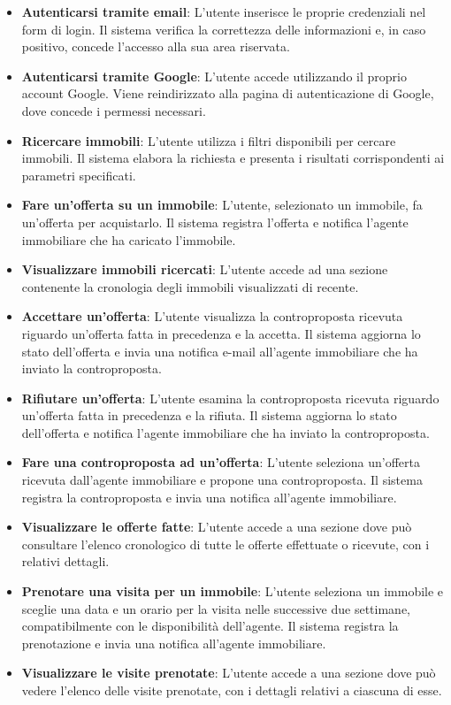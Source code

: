 \documentclass{book}
\begin{document}
\begin{itemize}
    \item \textbf{Autenticarsi tramite email}: L'utente inserisce le proprie credenziali nel form di login. Il sistema verifica la correttezza delle informazioni e, in caso positivo, concede l'accesso alla sua area riservata.
    \item \textbf{Autenticarsi tramite Google}: L'utente accede utilizzando il proprio account Google. Viene reindirizzato alla pagina di autenticazione di Google, dove concede i permessi necessari.
    \item \textbf{Ricercare immobili}: L'utente utilizza i filtri disponibili per cercare immobili. Il sistema elabora la richiesta e presenta i risultati corrispondenti ai parametri specificati.
    \item \textbf{Fare un'offerta su un immobile}: L'utente, selezionato un immobile, fa un'offerta per acquistarlo. Il sistema registra l'offerta e notifica l'agente immobiliare che ha caricato l'immobile.
    \item \textbf{Visualizzare immobili ricercati}: L'utente accede ad una sezione contenente la cronologia degli immobili visualizzati di recente.
    \item \textbf{Accettare un'offerta}: L'utente visualizza la controproposta ricevuta riguardo un'offerta fatta in precedenza e la accetta. Il sistema aggiorna lo stato dell'offerta e invia una notifica e-mail all'agente immobiliare che ha inviato la controproposta.
    \item \textbf{Rifiutare un'offerta}: L'utente esamina la controproposta ricevuta riguardo un'offerta fatta in precedenza e la rifiuta. Il sistema aggiorna lo stato dell'offerta e notifica l'agente immobiliare che ha inviato la controproposta.
    \item \textbf{Fare una controproposta ad un'offerta}: L'utente seleziona un'offerta ricevuta dall'agente immobiliare e propone una controproposta. Il sistema registra la controproposta e invia una notifica all'agente immobiliare.
    \item \textbf{Visualizzare le offerte fatte}: L'utente accede a una sezione dove può consultare l'elenco cronologico di tutte le offerte effettuate o ricevute, con i relativi dettagli.
    \item \textbf{Prenotare una visita per un immobile}: L'utente seleziona un immobile e sceglie una data e un orario per la visita nelle successive due settimane, compatibilmente con le disponibilità dell'agente. Il sistema registra la prenotazione e invia una notifica all'agente immobiliare.
    \item \textbf{Visualizzare le visite prenotate}: L'utente accede a una sezione dove può vedere l'elenco delle visite prenotate, con i dettagli relativi a ciascuna di esse.
\end{itemize}
\end{document}
